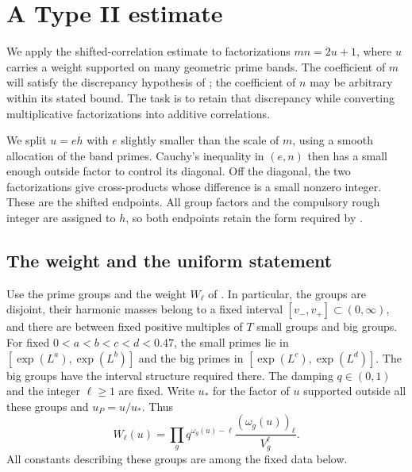 \section{A Type II estimate}\label{sec:typeii}

We apply the shifted-correlation estimate to factorizations $mn=2u+1$,
where $u$ carries a weight supported on many geometric prime bands.
The coefficient of $m$ will satisfy the discrepancy hypothesis of
; the coefficient of $n$ may be arbitrary within its
stated bound. The task is to retain that discrepancy while converting
multiplicative factorizations into additive correlations.

We split $u=eh$ with $e$ slightly smaller than the scale of $m$, using
a smooth allocation of the band primes. Cauchy's inequality in $(e,n)$
then has a small enough outside factor to control its diagonal. Off the
diagonal, the two factorizations give cross-products whose difference is
a small nonzero integer. These are the shifted endpoints. All group
factors and the compulsory rough integer are assigned to $h$, so both
endpoints retain the form required by .

\subsection{The weight and the uniform statement}

Use the prime groups and the weight $W_\ell$ of . In
particular, the groups are disjoint, their harmonic masses belong to a fixed
interval $[v_-,v_+]\subset(0,\infty)$, and there are between fixed positive
multiples of $T$ small groups and big groups. For fixed
$0<a<b<c<d<0.47$, the small primes lie in
$[\exp(L^a),\exp(L^b)]$ and the big primes in
$[\exp(L^c),\exp(L^d)]$. The big groups have the interval structure required
there. The damping $q\in(0,1)$ and the integer $\ell\geq1$ are fixed.
Write $u_*$ for the factor of $u$ supported outside all these groups and
$u_P=u/u_*$. Thus
\[
 W_\ell(u)=\prod_g
       q^{\omega_g(u)-\ell}\frac{(\omega_g(u))_\ell}{V_g^\ell}.
\]
All constants describing these groups are among the fixed data below.

